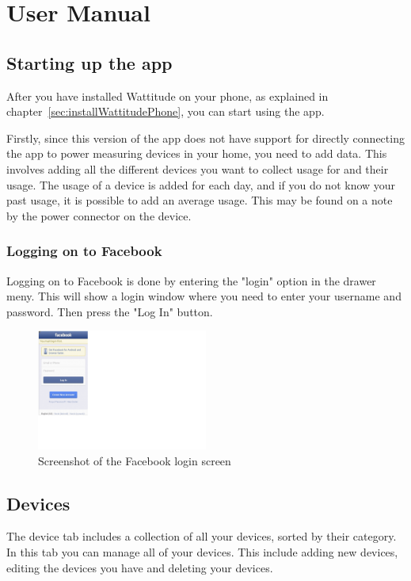 \chapter{User Manual}

\section{Starting up the app}
After you have installed Wattitude on your phone, as explained in chapter~\ref{sec:installWattitudePhone}, you can start using the app. 

Firstly, since this version of the app does not have support for directly connecting the app to power measuring devices in your home, you need to add data. This involves adding all the different devices you want to collect usage for and their usage. The usage of a device is added for each day, and if you do not know your past usage, it is possible to add an average usage. This may be found on a note by the power connector on the device.

\subsection{Logging on to Facebook}
Logging on to Facebook is done by entering the "login" option in the drawer meny. This will show a login window where you need to enter your username and password. Then press the "Log In" button. 

\begin{figure}[H]
\centering
\includegraphics[width=0.5\textwidth, clip, trim=0cm 5.5cm 20.5cm 0cm]{appendix/usermanual/fig/Facebooklogin.png}
\caption{Screenshot of the Facebook login screen}
\end{figure}


\label{sec:devices}
\section{Devices}
The device tab includes a collection of all your devices, sorted by their category. In this tab you can manage all of your devices. This include adding new devices, editing the devices you have and deleting your devices. 
